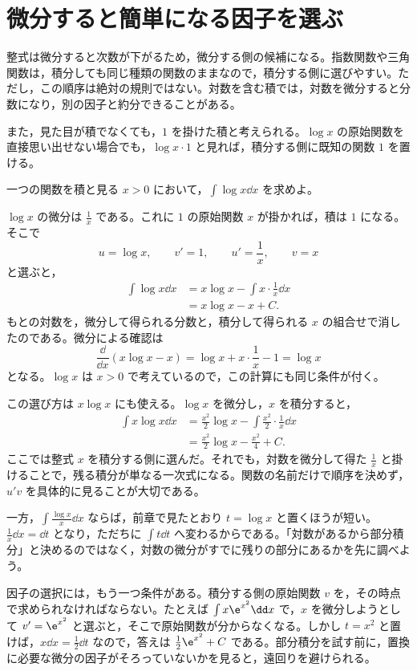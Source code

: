 \section{微分すると簡単になる因子を選ぶ}\label{節:部分積分の因子選択}

整式は微分すると次数が下がるため，微分する側の候補になる。指数関数や三角関数は，積分しても同じ種類の関数のままなので，積分する側に選びやすい。ただし，この順序は絶対の規則ではない。対数を含む積では，対数を微分すると分数になり，別の因子と約分できることがある。

また，見た目が積でなくても，$1$ を掛けた積と考えられる。$\log x$ の原始関数を直接思い出せない場合でも，$\log x\cdot1$ と見れば，積分する側に既知の関数 $1$ を置ける。

\begin{example}{一つの関数を積と見る}
$x>0$ において，$\int\log x\dd x$ を求めよ。
\end{example}

$\log x$ の微分は $\frac1x$ である。これに $1$ の原始関数 $x$ が掛かれば，積は $1$ になる。そこで
\[
 u=\log x,\qquad v'=1,
 \qquad u'=\frac1x,\qquad v=x
\]
と選ぶと，
\[
\begin{aligned}
 \int\log x\dd x
 &=x\log x-\int x\cdot\frac1x\dd x\\
 &=x\log x-x+C.
\end{aligned}
\]
もとの対数を，微分して得られる分数と，積分して得られる $x$ の組合せで消したのである。微分による確認は
\[
 \frac{\dd}{\dd x}(x\log x-x)
 =\log x+x\cdot\frac1x-1=\log x
\]
となる。$\log x$ は $x>0$ で考えているので，この計算にも同じ条件が付く。

この選び方は $x\log x$ にも使える。$\log x$ を微分し，$x$ を積分すると，
\[
\begin{aligned}
 \int x\log x\dd x
 &=\frac{x^2}{2}\log x
   -\int\frac{x^2}{2}\cdot\frac1x\dd x\\
 &=\frac{x^2}{2}\log x-\frac{x^2}{4}+C.
\end{aligned}
\]
ここでは整式 $x$ を積分する側に選んだ。それでも，対数を微分して得た $\frac1x$ と掛けることで，残る積分が単なる一次式になる。関数の名前だけで順序を決めず，$u'v$ を具体的に見ることが大切である。

一方，$\int\frac{\log x}{x}\dd x$ ならば，前章で見たとおり $t=\log x$ と置くほうが短い。$\frac1x\dd x=\dd t$ となり，ただちに $\int t\dd t$ へ変わるからである。「対数があるから部分積分」と決めるのではなく，対数の微分がすでに残りの部分にあるかを先に調べよう。

因子の選択には，もう一つ条件がある。積分する側の原始関数 $v$ を，その時点で求められなければならない。たとえば $\int x\e^{x^2}\dd x$ で，$x$ を微分しようとして $v'=\e^{x^2}$ と選ぶと，そこで原始関数が分からなくなる。しかし $t=x^2$ と置けば，$x\dd x=\frac12\dd t$ なので，答えは $\frac12\e^{x^2}+C$ である。部分積分を試す前に，置換に必要な微分の因子がそろっていないかを見ると，遠回りを避けられる。

